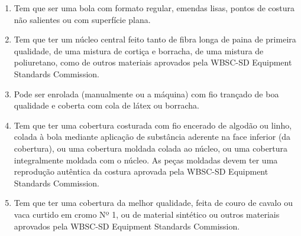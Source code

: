 \begin{multicols}{2}
	\begin{enumerate}[label= \arabic*)]
		\item  Tem que ser uma bola com formato regular, emendas lisas, pontos de costura não
		salientes ou com superfície plana.
		\item Tem que ter um núcleo central feito tanto de fibra longa de paina de primeira
		qualidade, de uma mistura de cortiça e borracha, de uma mistura de poliuretano,
		como de outros materiais aprovados pela WBSC-SD Equipment Standards Commission.
		\item  Pode ser enrolada (manualmente ou a máquina) com fio trançado de boa qualidade
		e coberta com cola de látex ou borracha.
		\item Tem que ter uma cobertura costurada com fio encerado de algodão ou linho, colada
		à bola mediante aplicação de substância aderente na face inferior (da cobertura), ou
		uma cobertura moldada colada ao núcleo, ou uma cobertura integralmente moldada
		com o núcleo. As peças moldadas devem ter uma reprodução autêntica da costura
		aprovada pela WBSC-SD Equipment Standards Commission.
		\item  Tem que ter uma cobertura da melhor qualidade, feita de couro de cavalo ou vaca
		curtido em cromo Nº 1, ou de material sintético ou outros materiais aprovados pela
		WBSC-SD Equipment Standards Commission.
	\end{enumerate}
\end{multicols}

